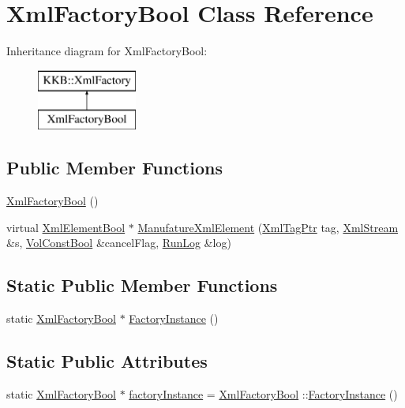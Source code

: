 \hypertarget{class_xml_factory_bool}{}\section{Xml\+Factory\+Bool Class Reference}
\label{class_xml_factory_bool}
Inheritance diagram for Xml\+Factory\+Bool\+:\begin{figure}[H]
\begin{center}
\leavevmode
\includegraphics[height=2.000000cm]{class_xml_factory_bool}
\end{center}
\end{figure}
\subsection*{Public Member Functions}
\begin{DoxyCompactItemize}
\item 
\hyperlink{class_xml_factory_bool_a0981889ef45106ad5c1c60a773916bd2}{Xml\+Factory\+Bool} ()
\item 
virtual \hyperlink{class_k_k_b_1_1_xml_element_bool}{Xml\+Element\+Bool} $\ast$ \hyperlink{class_xml_factory_bool_a4073506684a9e7d09d10a13c7fd91fab}{Manufature\+Xml\+Element} (\hyperlink{namespace_k_k_b_a9253a3ea8a5da18ca82be4ca2b390ef0}{Xml\+Tag\+Ptr} tag, \hyperlink{class_k_k_b_1_1_xml_stream}{Xml\+Stream} \&s, \hyperlink{namespace_k_k_b_a7d390f568e2831fb76b86b56c87bf92f}{Vol\+Const\+Bool} \&cancel\+Flag, \hyperlink{class_k_k_b_1_1_run_log}{Run\+Log} \&log)
\end{DoxyCompactItemize}
\subsection*{Static Public Member Functions}
\begin{DoxyCompactItemize}
\item 
static \hyperlink{class_xml_factory_bool}{Xml\+Factory\+Bool} $\ast$ \hyperlink{class_xml_factory_bool_a571558b477fb78892f0972f8a32f0b9e}{Factory\+Instance} ()
\end{DoxyCompactItemize}
\subsection*{Static Public Attributes}
\begin{DoxyCompactItemize}
\item 
static \hyperlink{class_xml_factory_bool}{Xml\+Factory\+Bool} $\ast$ \hyperlink{class_xml_factory_bool_ac52a5df8a1edcd48cc765148b143c9f2}{factory\+Instance} = \hyperlink{class_xml_factory_bool}{Xml\+Factory\+Bool} \+::\hyperlink{class_xml_factory_bool_a571558b477fb78892f0972f8a32f0b9e}{Factory\+Instance} ()
\end{DoxyCompactItemize}


